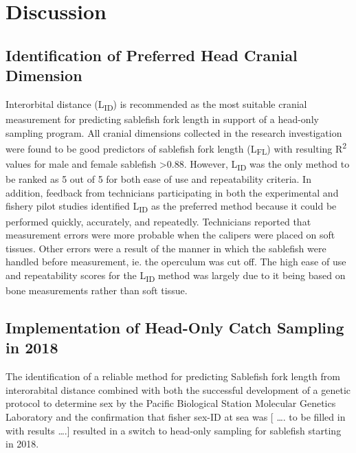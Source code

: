 \documentclass[12pt]{article}\usepackage[]{graphicx}\usepackage[]{color}
\begin{document}
\hypertarget{discussion}{%
\section{Discussion}\label{discussion}}

\hypertarget{identification-of-preferred-head-cranial-dimension}{%
\subsection{Identification of Preferred Head Cranial Dimension}\label{identification-of-preferred-head-cranial-dimension}}

Interorbital distance (L\textsubscript{ID}) is recommended as the most suitable cranial measurement for predicting sablefish fork length in support of a head-only sampling program. All cranial dimensions collected in the research investigation were found to be good predictors of sablefish fork length (L\textsubscript{FL}) with resulting R\textsuperscript{2} values for male and female sablefish \textgreater0.88. However, L\textsubscript{ID} was the only method to be ranked as 5 out of 5 for both ease of use and repeatability criteria. In addition, feedback from technicians participating in both the experimental and fishery pilot studies identified L\textsubscript{ID} as the preferred method because it could be performed quickly, accurately, and repeatedly. Technicians reported that measurement errors were more probable when the calipers were placed on soft tissues. Other errors were a result of the manner in which the sablefish were handled before measurement, ie. the operculum was cut off. The high ease of use and repeatability scores for the L\textsubscript{ID} method was largely due to it being based on bone measurements rather than soft tissue.

\hypertarget{implementation-of-head-only-catch-sampling-in-2018}{%
\subsection{Implementation of Head-Only Catch Sampling in 2018}\label{implementation-of-head-only-catch-sampling-in-2018}}

The identification of a reliable method for predicting Sablefish fork length from interorabital distance combined with both the successful development of a genetic protocol to determine sex by the Pacific Biological Station Molecular Genetics Laboratory and the confirmation that fisher sex-ID at sea was {[} \ldots. to be filled in with results \ldots.{]} resulted in a switch to head-only sampling for sablefish starting in 2018.
\end{document}
